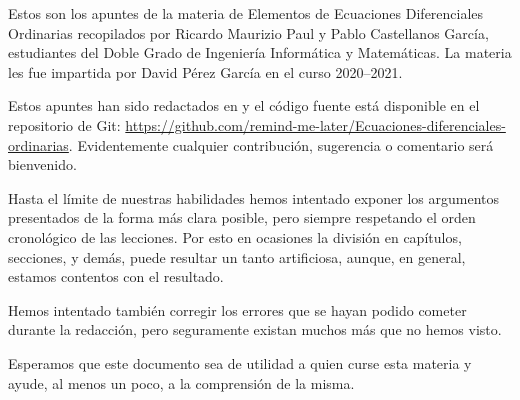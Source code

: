 \documentclass[ecuaciones_diferenciales.tex]{subfiles}
\begin{document}
Estos son los apuntes de la materia de Elementos de Ecuaciones Diferenciales 
Ordinarias recopilados por Ricardo Maurizio Paul y Pablo Castellanos
García, estudiantes del Doble Grado de Ingeniería Informática y Matemáticas. La
materia les fue impartida por David Pérez García en el curso 2020--2021.

Estos apuntes han sido redactados en  y el código fuente 
está disponible en el repositorio de Git:
\url{https://github.com/remind-me-later/Ecuaciones-diferenciales-ordinarias}.
Evidentemente cualquier contribución, sugerencia o comentario será bienvenido.

Hasta el límite de nuestras habilidades hemos intentado exponer los argumentos 
presentados de la forma más clara posible, pero siempre respetando el orden
cronológico de las lecciones. Por esto en ocasiones la división en capítulos,
secciones, y demás, puede resultar un tanto artificiosa, aunque, en general,
estamos contentos con el resultado.

Hemos intentado también corregir los errores que se hayan podido cometer durante
la redacción, pero seguramente existan muchos más que no hemos visto.

Esperamos que este documento sea de utilidad a quien curse esta materia y ayude,
al menos un poco, a la comprensión de la misma.
\end{document}
